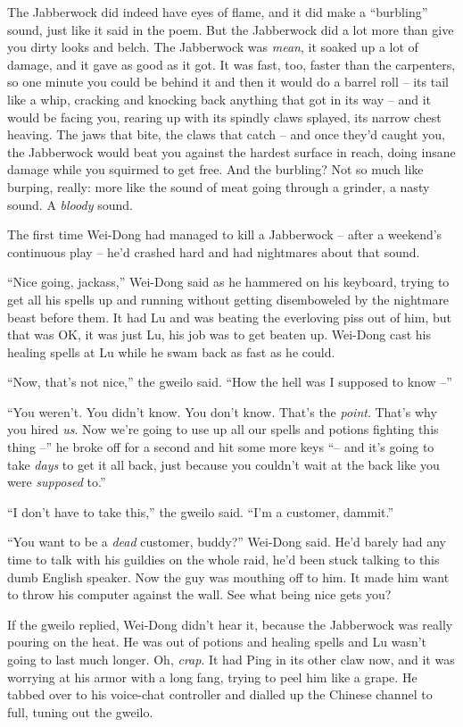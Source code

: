 The Jabberwock did indeed have eyes of flame, and it did make a
``burbling'' sound, just like it said in the poem. But the Jabberwock
did a lot more than give you dirty looks and belch. The Jabberwock
was \emph{mean}, it soaked up a lot of damage, and it gave as good
as it got. It was fast, too, faster than the carpenters, so one
minute you could be behind it and then it would do a barrel roll --
its tail like a whip, cracking and knocking back anything that got
in its way -- and it would be facing you, rearing up with its
spindly claws splayed, its narrow chest heaving. The jaws that
bite, the claws that catch -- and once they'd caught you, the
Jabberwock would beat you against the hardest surface in reach,
doing insane damage while you squirmed to get free. And the
burbling? Not so much like burping, really: more like the sound of
meat going through a grinder, a nasty sound. A \emph{bloody}
sound.

The first time Wei-Dong had managed to kill a Jabberwock -- after a
weekend's continuous play -- he'd crashed hard and had nightmares
about that sound.

``Nice going, jackass,'' Wei-Dong said as he hammered on his
keyboard, trying to get all his spells up and running without
getting disemboweled by the nightmare beast before them. It had Lu
and was beating the everloving piss out of him, but that was OK, it
was just Lu, his job was to get beaten up. Wei-Dong cast his
healing spells at Lu while he swam back as fast as he could.

``Now, that's not nice,'' the gweilo said. ``How the hell was I
supposed to know --''

``You weren't. You didn't know. You don't know. That's the
\emph{point}. That's why you hired \emph{us}. Now we're going to
use up all our spells and potions fighting this thing --'' he broke
off for a second and hit some more keys ``-- and it's going to take
\emph{days} to get it all back, just because you couldn't wait at
the back like you were \emph{supposed} to.''

``I don't have to take this,'' the gweilo said. ``I'm a customer,
dammit.''

``You want to be a \emph{dead} customer, buddy?'' Wei-Dong said. He'd
barely had any time to talk with his guildies on the whole raid,
he'd been stuck talking to this dumb English speaker. Now the guy
was mouthing off to him. It made him want to throw his computer
against the wall. See what being nice gets you?

If the gweilo replied, Wei-Dong didn't hear it, because the
Jabberwock was really pouring on the heat. He was out of potions
and healing spells and Lu wasn't going to last much longer. Oh,
\emph{crap}. It had Ping in its other claw now, and it was worrying
at his armor with a long fang, trying to peel him like a grape. He
tabbed over to his voice-chat controller and dialled up the Chinese
channel to full, tuning out the gweilo.

